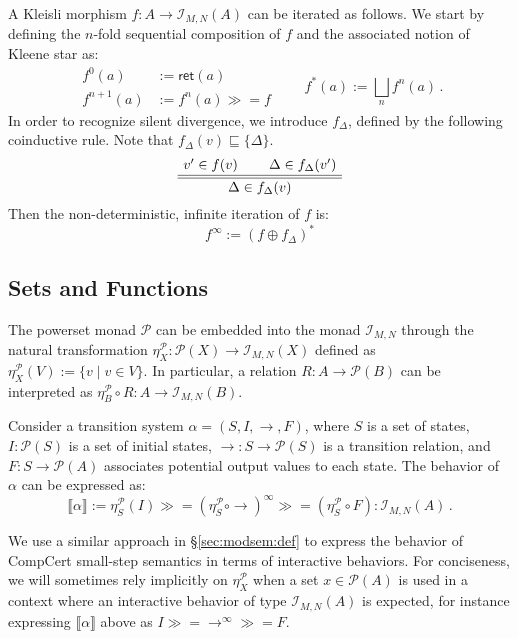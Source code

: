 \documentclass[acmsmall,timestamp,review,anonymous]{acmart}
\newcommand{\kw}[1]{\ensuremath{ \mathsf{#1} }}
\newcommand{\bind}{\gg\!\!=}
\begin{document}
A Kleisli morphism $f : A \rightarrow \mathcal{I}_{M,N}(A)$
can be iterated as follows.
We start by defining
the $n$-fold sequential composition of $f$
and the associated notion of Kleene star as:
\[
  \begin{array}{rl}
    f^0(a) &:= \kw{ret}(a) \\
    f^{n+1}(a) &:= f^n(a) \bind f
  \end{array}
  \qquad
  f^*(a) := \bigsqcup_n f^n(a) \,.
\]
In order to recognize silent divergence,
we introduce $f_\Delta$,
defined by the following coinductive rule.
Note that $f_\Delta(v) \sqsubseteq \{\Delta\}$.
\[
    \AxiomC{$v' \in f(v)$}
    \AxiomC{$\Delta \in f_\Delta(v')$}
    \doubleLine
    \BinaryInfC{$\Delta \in f_\Delta(v)$}
    \DisplayProof
\]
Then the non-deterministic, infinite iteration of $f$ is:
\[
    f^\infty := (f \oplus f_\Delta)^*
\]


\subsection{Sets and Functions} \label{sec:monad:powerset} %

The powerset monad $\mathcal{P}$
can be embedded into the monad $\mathcal{I}_{M,N}$
through the natural transformation
$\eta^\mathcal{P}_X : \mathcal{P}(X) \rightarrow \mathcal{I}_{M,N}(X)$
defined as
$\eta^\mathcal{P}_X(V) := \{ v \mid v \in V \}$.
In particular,
a relation $R : A \rightarrow \mathcal{P}(B)$
can be interpreted as
$\eta^\mathcal{P}_B \circ R : A \rightarrow \mathcal{I}_{M,N}(B)$.

\begin{example} \label{ex:ts} %
Consider a transition system $\alpha = (S, I, {\rightarrow}, F)$,
where
$S$ is a set of states,
$I : \mathcal{P}(S)$
is a set of initial states,
${\rightarrow} : S \rightarrow \mathcal{P}(S)$
is a transition relation, and
$F : S \rightarrow \mathcal{P}(A)$
associates potential output values to each state.
The behavior of $\alpha$ can be expressed as:
\[
    \llbracket \alpha \rrbracket :=
    \eta^\mathcal{P}_S(I) \bind
    (\eta^\mathcal{P}_S \circ {\rightarrow})^\infty \bind
    (\eta^\mathcal{P}_S \circ F)
    : \mathcal{I}_{M,N}(A) \,.
\]
\end{example}

We use a similar approach in \S\ref{sec:modsem:def}
to express the behavior of CompCert small-step semantics
in terms of interactive behaviors.
For conciseness,
we will sometimes rely implicitly on $\eta_X^\mathcal{P}$
when a set $x \in \mathcal{P}(A)$ is used
in a context where an interactive behavior
of type $\mathcal{I}_{M,N}(A)$ is expected,
for instance expressing $\llbracket \alpha \rrbracket$ above as
$I \bind {\rightarrow}^\infty \bind F$.
\end{document}
